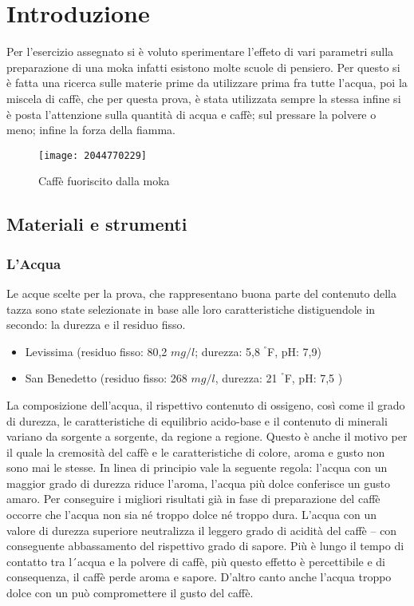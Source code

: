 \chapter{Introduzione}
Per l'esercizio assegnato si è voluto sperimentare l'effeto di vari parametri sulla preparazione di una moka infatti esistono molte scuole di pensiero.
Per questo si è fatta una ricerca sulle materie prime da utilizzare prima fra tutte l'acqua, poi la miscela di caffè, che per questa prova, è stata utilizzata sempre la stessa infine si è posta l'attenzione sulla quantità di acqua e caffè; sul pressare la polvere o meno; infine la forza della fiamma.
\begin{figure}[h]
  \centering
  \texttt{[image: 2044770229]}
  \caption{Caffè fuoriscito dalla moka}
  \label{fig:moka}
\end{figure}
\section{Materiali e strumenti}
\subsection{L'Acqua}
Le acque scelte per la prova, che rappresentano buona parte del contenuto della tazza sono state selezionate in base alle loro caratteristiche distiguendole in secondo: la durezza e il residuo fisso.
\begin{itemize}
  \item Levissima (residuo fisso: 80,2 $mg/l$; durezza: 5,8 $^{°}$F, pH: 7,9)
  \item San Benedetto (residuo fisso: 268 $mg/l$, durezza: 21 $^{°}$F, pH: 7,5 )
\end{itemize}
La composizione dell’acqua, il rispettivo contenuto di ossigeno, così come il grado di durezza, le caratteristiche di equilibrio acido-base e il contenuto di minerali variano da sorgente a sorgente, da regione a regione. Questo è anche il motivo per il quale la cremosità del caffè e le caratteristiche di colore, aroma e gusto non sono mai le stesse.
In linea di principio vale la seguente regola: l’acqua con un maggior grado di durezza riduce l’aroma, l’acqua più dolce conferisce un gusto amaro.
Per conseguire i migliori risultati già in fase di preparazione del caffè occorre che l’acqua non sia né troppo dolce né troppo dura. L’acqua con un valore di durezza superiore neutralizza il leggero grado di acidità del caffè – con conseguente abbassamento del rispettivo grado di sapore. Più è lungo il tempo di contatto tra l´acqua e la polvere di caffè, più questo effetto è percettibile e di consequenza, il caffè perde aroma e sapore. D’altro canto anche l’acqua troppo dolce con un può compromettere il gusto del caffè\cite{mo_2017}\cite{acqua}.

